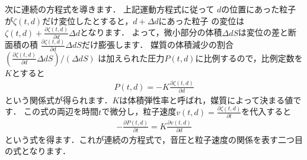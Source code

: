 次に連続の方程式を導きます．
上記運動方程式に従って
$d$の位置にあった粒子が$\zeta(t,d)$だけ変位したとすると，$d+\Delta d$にあった粒子
の変位は$\zeta(t,d) + \frac{\partial \zeta(t,d)}{\partial d}\Delta d$となります．
よって，微小部分の体積$\Delta d S$は変位の差と断面積の積
$\frac{\partial \zeta(t,d)}{\partial d}\Delta d S$だけ膨張します．
媒質の体積減少の割合$(\frac{\partial \zeta(t,d)}{\partial d}\Delta d S) / (\Delta d S)$
は加えられた圧力$P(t,d)$に比例するので，比例定数を$K$とすると
\begin{align}
P(t,d) = -K \frac{\partial \zeta(t,d)}{\partial d}
\end{align}
という関係式が得られます．$K$は体積弾性率と呼ばれ，媒質によって決まる値です．
この式の両辺を時間$t$で微分し，粒子速度$v(t,d) = \frac{\partial \zeta(t,d)}{\partial t}$を代入すると
\begin{align}
-\frac{\partial P(t,d)}{\partial t} = K \frac{\partial v(t,d)}{\partial d}
\label{eq:conteq}
\end{align}
という式を得ます．これが連続の方程式で，音圧と粒子速度の関係を表す二つ目の式となります．

